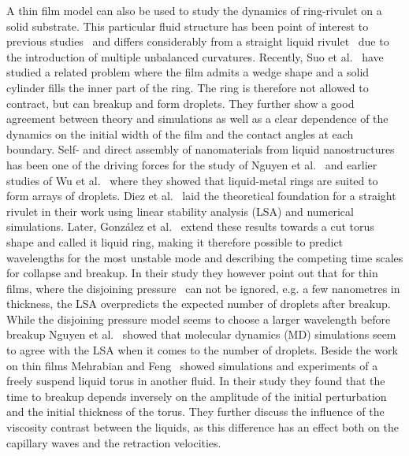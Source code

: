 \documentclass[twoside,twocolumn,9pt]{article}
\begin{document}
A thin film model can also be used to study the dynamics of ring-rivulet on a solid substrate.
This particular fluid structure has been point of interest to previous studies~\cite{nguyenCompetitionCollapseBreakup2012, gonzalezStabilityLiquidRing2013, wuCompetingLiquidPhase2011} and differs considerably from a straight liquid rivulet~\cite{diezBreakupFluidRivulets2009, diezStabilityFinitelengthRivulet2009, diezInstabilityTransverseLiquid2012} due to the introduction of multiple unbalanced curvatures.
Recently, Suo et al.~\cite{suoDewettingCornerFilm2023a} have studied a related problem where the film admits a wedge shape and a solid cylinder fills the inner part of the ring. 
The ring is therefore not allowed to contract, but can breakup and form droplets.
They further show a good agreement between theory and simulations as well as a clear dependence of the dynamics on the initial width of the film and the contact angles at each boundary.
Self- and direct assembly of nanomaterials from liquid nanostructures has been one of the driving forces for the study of Nguyen et al.~\cite{nguyenCompetitionCollapseBreakup2012} and earlier studies of Wu et al.~\cite{wuBreakupPatternedNanoscale2010} where they showed that liquid-metal rings are suited to form arrays of droplets.
Diez et al.~\cite{diezBreakupFluidRivulets2009, diezStabilityFinitelengthRivulet2009} laid the theoretical foundation for a straight rivulet in their work using linear stability analysis (LSA) and numerical simulations. 
Later, Gonz{\'a}lez et al.~\cite{gonzalezStabilityLiquidRing2013} extend these results towards a cut torus shape and called it liquid ring, making it therefore possible to predict wavelengths for the most unstable mode and describing the competing time scales for collapse and breakup.
In their study they however point out that for thin films, where the disjoining pressure~\cite{schwartzSimulationDropletMotion1998, beckerComplexDewettingScenarios2003, oronLongscaleEvolutionThin1997} can not be ignored, e.g. a few nanometres in thickness, the LSA overpredicts  the expected number of droplets after breakup.
While the disjoining pressure model seems to choose a larger wavelength before breakup Nguyen et al.~\cite{nguyenCompetitionCollapseBreakup2012} showed that molecular dynamics (MD) simulations seem to agree with the LSA when it comes to the number of droplets.
Beside the work on thin films Mehrabian and Feng~\cite{mehrabianCapillaryBreakupLiquid2013} showed simulations and experiments of a freely suspend liquid torus in another fluid.
In their study they found that the time to breakup depends inversely on the amplitude of the initial perturbation and the initial thickness of the torus.
They further discuss the influence of the viscosity contrast between the liquids, as this difference has an effect both on the capillary waves and the retraction velocities.
\end{document}
